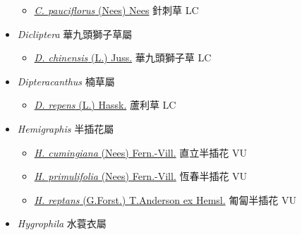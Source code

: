 \begin{itemize}
  \begin{itemize}
        \item[] \href{http://www.theplantlist.org/tpl1.1/search?q=Codonacanthus+pauciflorus}{\textit{C. pauciflorus} (Nees) Nees}   針刺草   LC
  \end{itemize}
 \item[] \textit{Dicliptera} 華九頭獅子草屬
                                
  \begin{itemize}
        \item[] \href{http://www.theplantlist.org/tpl1.1/search?q=Dicliptera+chinensis}{\textit{D. chinensis} (L.) Juss.}   華九頭獅子草   LC
  \end{itemize}
 \item[] \textit{Dipteracanthus} 楠草屬
                                
  \begin{itemize}
        \item[] \href{http://www.theplantlist.org/tpl1.1/search?q=Dipteracanthus+repens}{\textit{D. repens} (L.) Hassk.}   蘆利草   LC
  \end{itemize}
 \item[] \textit{Hemigraphis} 半插花屬
                                
  \begin{itemize}
        \item[] \href{http://www.theplantlist.org/tpl1.1/search?q=Hemigraphis+cumingiana}{\textit{H. cumingiana} (Nees) Fern.-Vill.}   直立半插花   VU
        \item[] \href{http://www.theplantlist.org/tpl1.1/search?q=Hemigraphis+primulifolia}{\textit{H. primulifolia} (Nees) Fern.-Vill.}   恆春半插花   VU
        \item[] \href{http://www.theplantlist.org/tpl1.1/search?q=Hemigraphis+reptans}{\textit{H. reptans} (G.Forst.) T.Anderson ex Hemsl.}   匍匐半插花   VU
  \end{itemize}
 \item[] \textit{Hygrophila} 水蓑衣屬
                                

\end{itemize}
